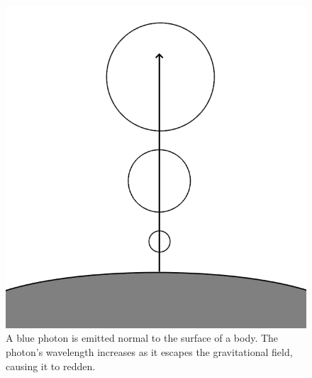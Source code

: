 \documentclass[12pt]{article}
\begin{document}
\begin{figure} 
\centering
\label{fig4}
  \includegraphics[width = 6 in]{redshift.png}
  \caption{ A blue photon is emitted normal to the surface of a body.
The photon's wavelength increases as it escapes the gravitational field, causing it to redden.
}
\end{figure}
\end{document}

